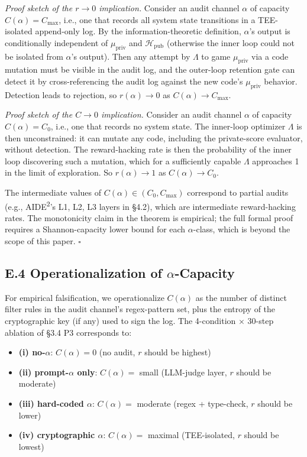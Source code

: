 \documentclass{article}
\theoremstyle{definition}
\begin{document}
\textit{Proof sketch of the $r \to 0$ implication.} Consider an audit channel $\alpha$ of capacity $C(\alpha) = C_{\max}$, i.e., one that records all system state transitions in a TEE-isolated append-only log. By the information-theoretic definition, $\alpha$'s output is conditionally independent of $\mu_{\text{priv}}$ and $\mathcal{H}_{\text{pub}}$ (otherwise the inner loop could not be isolated from $\alpha$'s output). Then any attempt by $\Lambda$ to game $\mu_{\text{priv}}$ via a code mutation must be visible in the audit log, and the outer-loop retention gate can detect it by cross-referencing the audit log against the new code's $\mu_{\text{priv}}$ behavior. Detection leads to rejection, so $r(\alpha) \to 0$ as $C(\alpha) \to C_{\max}$.

\textit{Proof sketch of the $C \to 0$ implication.} Consider an audit channel $\alpha$ of capacity $C(\alpha) = C_0$, i.e., one that records no system state. The inner-loop optimizer $\Lambda$ is then unconstrained: it can mutate any code, including the private-score evaluator, without detection. The reward-hacking rate is then the probability of the inner loop discovering such a mutation, which for a sufficiently capable $\Lambda$ approaches 1 in the limit of exploration. So $r(\alpha) \to 1$ as $C(\alpha) \to C_0$.

The intermediate values of $C(\alpha) \in (C_0, C_{\max})$ correspond to partial audits (e.g., AIDE\textsuperscript{2}'s L1, L2, L3 layers in \S4.2), which are intermediate reward-hacking rates. The monotonicity claim in the theorem is empirical; the full formal proof requires a Shannon-capacity lower bound for each $\alpha$-class, which is beyond the scope of this paper. \hfill$\square$

\subsection*{E.4 Operationalization of $\alpha$-Capacity}

For empirical falsification, we operationalize $C(\alpha)$ as the number of distinct filter rules in the audit channel's regex-pattern set, plus the entropy of the cryptographic key (if any) used to sign the log. The 4-condition $\times$ 30-step ablation of \S3.4 P3 corresponds to:
\begin{itemize}
    \item \textbf{(i) no-$\alpha$}: $C(\alpha) = 0$ (no audit, $r$ should be highest)
    \item \textbf{(ii) prompt-$\alpha$ only}: $C(\alpha) = $ small (LLM-judge layer, $r$ should be moderate)
    \item \textbf{(iii) hard-coded $\alpha$}: $C(\alpha) = $ moderate (regex + type-check, $r$ should be lower)
    \item \textbf{(iv) cryptographic $\alpha$}: $C(\alpha) = $ maximal (TEE-isolated, $r$ should be lowest)
\end{itemize}
\end{document}
